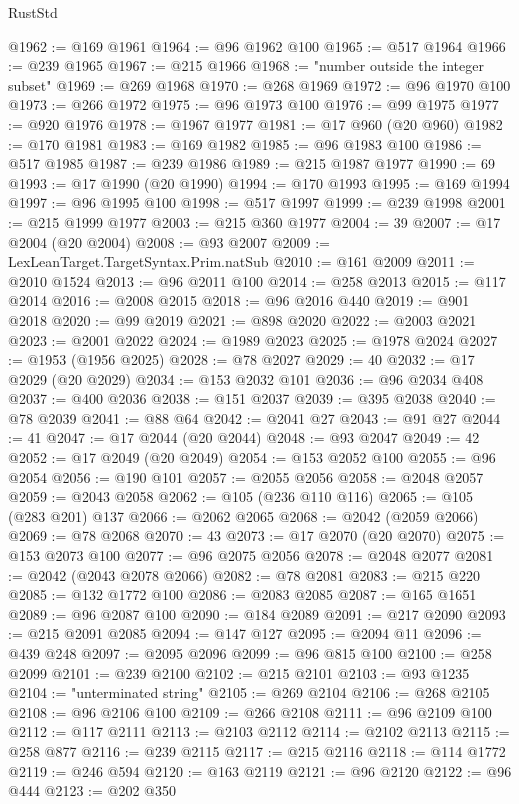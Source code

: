 \begin{lexlean}{RustStd}
\begin{coremodule}
@1962 := @169 @1961
@1964 := @96 @1962 @100
@1965 := @517 @1964
@1966 := @239 @1965
@1967 := @215 @1966
@1968 := "number outside the integer subset"
@1969 := @269 @1968
@1970 := @268 @1969
@1972 := @96 @1970 @100
@1973 := @266 @1972
@1975 := @96 @1973 @100
@1976 := @99 @1975
@1977 := @920 @1976
@1978 := @1967 @1977
@1981 := @17 @960 (@20 @960)
@1982 := @170 @1981
@1983 := @169 @1982
@1985 := @96 @1983 @100
@1986 := @517 @1985
@1987 := @239 @1986
@1989 := @215 @1987 @1977
@1990 := 69
@1993 := @17 @1990 (@20 @1990)
@1994 := @170 @1993
@1995 := @169 @1994
@1997 := @96 @1995 @100
@1998 := @517 @1997
@1999 := @239 @1998
@2001 := @215 @1999 @1977
@2003 := @215 @360 @1977
@2004 := 39
@2007 := @17 @2004 (@20 @2004)
@2008 := @93 @2007
@2009 := LexLeanTarget.TargetSyntax.Prim.natSub
@2010 := @161 @2009
@2011 := @2010 @1524
@2013 := @96 @2011 @100
@2014 := @258 @2013
@2015 := @117 @2014
@2016 := @2008 @2015
@2018 := @96 @2016 @440
@2019 := @901 @2018
@2020 := @99 @2019
@2021 := @898 @2020
@2022 := @2003 @2021
@2023 := @2001 @2022
@2024 := @1989 @2023
@2025 := @1978 @2024
@2027 := @1953 (@1956 @2025)
@2028 := @78 @2027
@2029 := 40
@2032 := @17 @2029 (@20 @2029)
@2034 := @153 @2032 @101
@2036 := @96 @2034 @408
@2037 := @400 @2036
@2038 := @151 @2037
@2039 := @395 @2038
@2040 := @78 @2039
@2041 := @88 @64
@2042 := @2041 @27
@2043 := @91 @27
@2044 := 41
@2047 := @17 @2044 (@20 @2044)
@2048 := @93 @2047
@2049 := 42
@2052 := @17 @2049 (@20 @2049)
@2054 := @153 @2052 @100
@2055 := @96 @2054
@2056 := @190 @101
@2057 := @2055 @2056
@2058 := @2048 @2057
@2059 := @2043 @2058
@2062 := @105 (@236 @110 @116)
@2065 := @105 (@283 @201) @137
@2066 := @2062 @2065
@2068 := @2042 (@2059 @2066)
@2069 := @78 @2068
@2070 := 43
@2073 := @17 @2070 (@20 @2070)
@2075 := @153 @2073 @100
@2077 := @96 @2075 @2056
@2078 := @2048 @2077
@2081 := @2042 (@2043 @2078 @2066)
@2082 := @78 @2081
@2083 := @215 @220
@2085 := @132 @1772 @100
@2086 := @2083 @2085
@2087 := @165 @1651
@2089 := @96 @2087 @100
@2090 := @184 @2089
@2091 := @217 @2090
@2093 := @215 @2091 @2085
@2094 := @147 @127
@2095 := @2094 @11
@2096 := @439 @248
@2097 := @2095 @2096
@2099 := @96 @815 @100
@2100 := @258 @2099
@2101 := @239 @2100
@2102 := @215 @2101
@2103 := @93 @1235
@2104 := "unterminated string"
@2105 := @269 @2104
@2106 := @268 @2105
@2108 := @96 @2106 @100
@2109 := @266 @2108
@2111 := @96 @2109 @100
@2112 := @117 @2111
@2113 := @2103 @2112
@2114 := @2102 @2113
@2115 := @258 @877
@2116 := @239 @2115
@2117 := @215 @2116
@2118 := @114 @1772
@2119 := @246 @594
@2120 := @163 @2119
@2121 := @96 @2120
@2122 := @96 @444
@2123 := @202 @350

\end{coremodule}
\end{lexlean}
